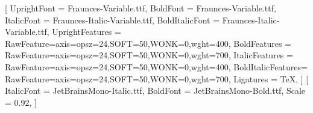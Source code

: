 
\usepackage{fontspec}
\setmainfont{Fraunces-Variable.ttf}[
  UprightFont       = Fraunces-Variable.ttf,
  BoldFont          = Fraunces-Variable.ttf,
  ItalicFont        = Fraunces-Italic-Variable.ttf,
  BoldItalicFont    = Fraunces-Italic-Variable.ttf,
  UprightFeatures   = {RawFeature={axis={opsz=24,SOFT=50,WONK=0,wght=400}}},
  BoldFeatures      = {RawFeature={axis={opsz=24,SOFT=50,WONK=0,wght=700}}},
  ItalicFeatures    = {RawFeature={axis={opsz=24,SOFT=50,WONK=0,wght=400}}},
  BoldItalicFeatures= {RawFeature={axis={opsz=24,SOFT=50,WONK=0,wght=700}}},
  Ligatures         = TeX,
]
\setmonofont{JetBrainsMono-Regular.ttf}[
  ItalicFont = JetBrainsMono-Italic.ttf,
  BoldFont   = JetBrainsMono-Bold.ttf,
  Scale      = 0.92,
]

\usepackage{xcolor}
\AtBeginDocument{\color{llmxText}}

\usepackage[unicode]{hyperref}

